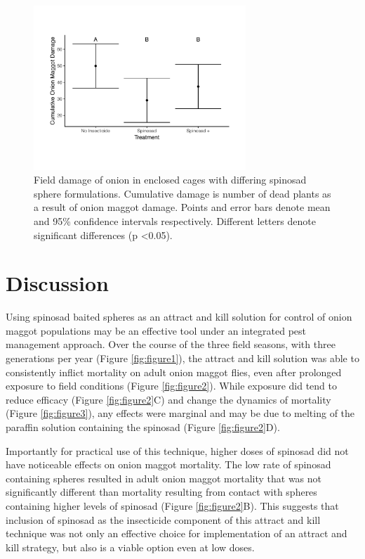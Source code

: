 \documentclass[alpha-refs]{wiley-article}
\begin{document}
\begin{figure}[bt]
\centering
\includegraphics[width = 8cm]{figures/final-figures/figure-5.pdf}
\caption{Field damage of onion in enclosed cages with differing spinosad sphere formulations.  Cumulative damage is number of dead plants as a result of onion maggot damage.  Points and error bars denote mean and 95\% confidence intervals respectively.  Different letters denote significant differences (p \textless 0.05).  }
\label{fig:figure5}
\end{figure}





\section{Discussion}

Using spinosad baited spheres as an attract and kill solution for control of onion maggot populations may be an effective tool under an integrated pest management approach.  Over the course of the three field seasons, with three generations per year (Figure \ref{fig:figure1}), the attract and kill solution was able to consistently inflict mortality on adult onion maggot flies, even after prolonged exposure to field conditions (Figure \ref{fig:figure2}).  While exposure did tend to reduce efficacy (Figure \ref{fig:figure2}C) and change the dynamics of mortality (Figure \ref{fig:figure3}), any effects were marginal and may be due to melting of the paraffin solution containing the spinosad (Figure \ref{fig:figure2}D).  

Importantly for practical use of this technique, higher doses of spinosad did not have noticeable effects on onion maggot mortality.  The low rate of spinosad containing spheres resulted in adult onion maggot mortality that was not significantly different than mortality resulting from contact with spheres containing higher levels of spinosad (Figure \ref{fig:figure2}B).  This suggests that inclusion of spinosad as the insecticide component of this attract and kill technique was not only an effective choice for implementation of an attract and kill strategy, but also is a viable option even at low doses.  
\end{document}
